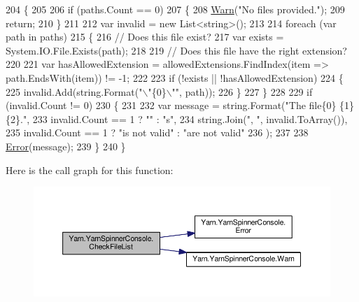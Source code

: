 \begin{DoxyCode}
204         \{
205 
206             \textcolor{keywordflow}{if} (paths.Count == 0)
207             \{
208                 \hyperlink{a00185_a979bb6f049b6c5294f745a19e24ddd9d}{Warn}(\textcolor{stringliteral}{"No files provided."});
209                 \textcolor{keywordflow}{return};
210             \}
211 
212             var invalid = \textcolor{keyword}{new} List<string>();
213 
214             \textcolor{keywordflow}{foreach} (var path \textcolor{keywordflow}{in} paths)
215             \{
216                 \textcolor{comment}{// Does this file exist?}
217                 var exists = System.IO.File.Exists(path);
218 
219                 \textcolor{comment}{// Does this file have the right extension?}
220 
221                 var hasAllowedExtension = allowedExtensions.FindIndex(item => path.EndsWith(item)) != -1;
222 
223                 \textcolor{keywordflow}{if} (!exists || !hasAllowedExtension)
224                 \{
225                     invalid.Add(string.Format(\textcolor{stringliteral}{"\(\backslash\)"\{0\}\(\backslash\)""}, path));
226                 \}
227             \}
228 
229             \textcolor{keywordflow}{if} (invalid.Count != 0)
230             \{
231 
232                 var message = string.Format(\textcolor{stringliteral}{"The file\{0\} \{1\} \{2\}."},
233                     invalid.Count == 1 ? \textcolor{stringliteral}{""} : \textcolor{stringliteral}{"s"},
234                                             string.Join(\textcolor{stringliteral}{", "}, invalid.ToArray()),
235                     invalid.Count == 1 ? \textcolor{stringliteral}{"is not valid"} : \textcolor{stringliteral}{"are not valid"}
236                 );
237 
238                 \hyperlink{a00185_a2f63f9f5b7634cb50ee75ff2eb18b137}{Error}(message);
239             \}
240         \}
\end{DoxyCode}


Here is the call graph for this function\-:
\nopagebreak
\begin{figure}[H]
\begin{center}
\leavevmode
\includegraphics[width=350pt]{a00185_ad77564b25725a771f0fd4da430582e6f_cgraph}
\end{center}
\end{figure}




